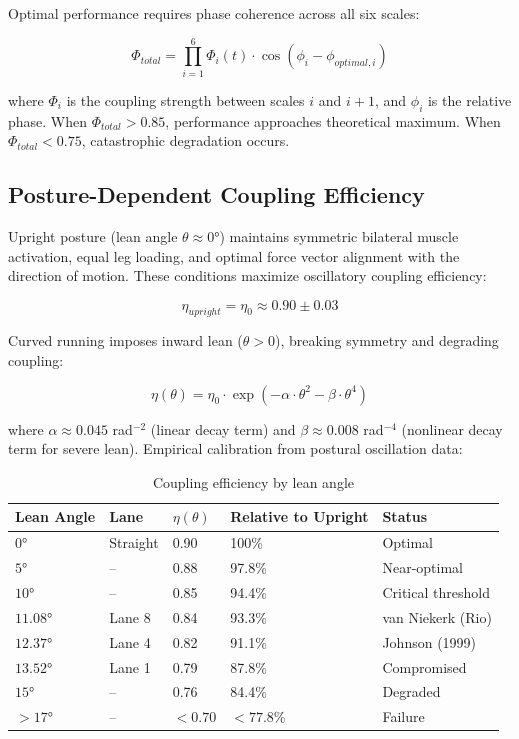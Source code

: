 Optimal performance requires phase coherence across all six scales:

\begin{equation}
\Phi_{total} = \prod_{i=1}^{6} \Phi_i(t) \cdot \cos(\phi_i - \phi_{optimal,i})
\end{equation}

where $\Phi_i$ is the coupling strength between scales $i$ and $i+1$, and $\phi_i$ is the relative phase. When $\Phi_{total} > 0.85$, performance approaches theoretical maximum. When $\Phi_{total} < 0.75$, catastrophic degradation occurs.

\subsection{Posture-Dependent Coupling Efficiency}

Upright posture (lean angle $\theta \approx 0°$) maintains symmetric bilateral muscle activation, equal leg loading, and optimal force vector alignment with the direction of motion. These conditions maximize oscillatory coupling efficiency:

\begin{equation}
\eta_{upright} = \eta_0 \approx 0.90 \pm 0.03
\end{equation}

Curved running imposes inward lean ($\theta > 0$), breaking symmetry and degrading coupling:

\begin{equation}
\eta(\theta) = \eta_0 \cdot \exp\left(-\alpha \cdot \theta^2 - \beta \cdot \theta^4\right)
\end{equation}

where $\alpha \approx 0.045$ rad$^{-2}$ (linear decay term) and $\beta \approx 0.008$ rad$^{-4}$ (nonlinear decay term for severe lean). Empirical calibration from postural oscillation data:

\begin{table}[H]
\centering
\caption{Coupling efficiency by lean angle}
\begin{tabular}{@{}lllll@{}}
\toprule
\textbf{Lean Angle} & \textbf{Lane} & \textbf{$\eta(\theta)$} & \textbf{Relative to Upright} & \textbf{Status} \\
\midrule
$0°$ & Straight & 0.90 & 100\% & Optimal \\
$5°$ & -- & 0.88 & 97.8\% & Near-optimal \\
$10°$ & -- & 0.85 & 94.4\% & Critical threshold \\
$11.08°$ & Lane 8 & 0.84 & 93.3\% & van Niekerk (Rio) \\
$12.37°$ & Lane 4 & 0.82 & 91.1\% & Johnson (1999) \\
$13.52°$ & Lane 1 & 0.79 & 87.8\% & Compromised \\
$15°$ & -- & 0.76 & 84.4\% & Degraded \\
$>17°$ & -- & $<0.70$ & $<77.8\%$ & Failure \\
\bottomrule
\end{tabular}
\end{table}

